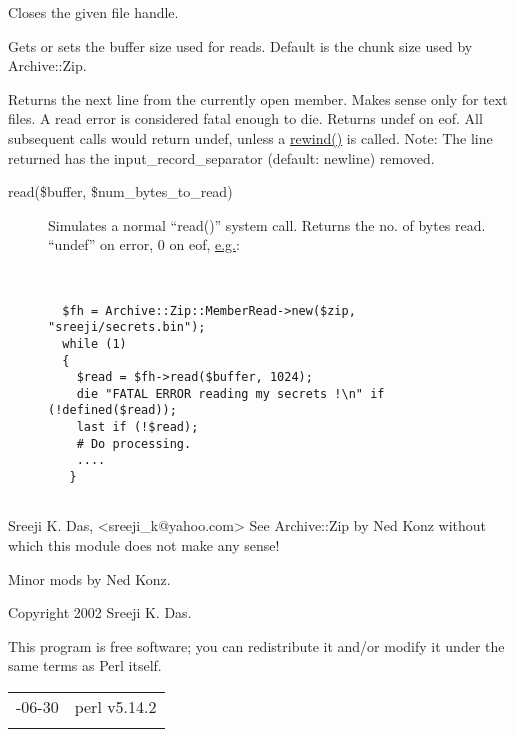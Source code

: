 \documentclass[]{article}
\renewcommand{\emph}[1]{\underline{#1}}
\begin{document}
\begin{description}
\itemsep1pt\parskip0pt
\item[\emph{close()}]
Closes the given file handle.
\end{description}

\begin{description}
\itemsep1pt\parskip0pt
\item[buffer\_size({[} \$size {]})]
Gets or sets the buffer size used for reads. Default is the chunk size
used by Archive::Zip.
\end{description}

\begin{description}
\itemsep1pt\parskip0pt
\item[\emph{getline()}]
Returns the next line from the currently open member. Makes sense only
for text files. A read error is considered fatal enough to die. Returns
undef on eof. All subsequent calls would return undef, unless a
\emph{rewind()} is called. Note: The line returned has the
input\_record\_separator (default: newline) removed.
\end{description}

\begin{description}
\item[read(\$buffer, \$num\_bytes\_to\_read)]
Simulates a normal ``read()'' system call. Returns the no. of bytes
read. ``undef'' on error, 0 on eof, \emph{e.g.}:

~

\begin{verbatim}
  $fh = Archive::Zip::MemberRead->new($zip, "sreeji/secrets.bin");
  while (1)
  {
    $read = $fh->read($buffer, 1024);
    die "FATAL ERROR reading my secrets !\n" if (!defined($read));
    last if (!$read);
    # Do processing.
    ....
   }
    
\end{verbatim}
\end{description}


Sreeji K. Das, \textless{}sreeji\_k@yahoo.com\textgreater{} See
Archive::Zip by Ned Konz without which this module does not make any
sense!

Minor mods by Ned Konz.


Copyright 2002 Sreeji K. Das.

This program is free software; you can redistribute it and/or modify it
under the same terms as Perl itself.

\begin{longtable}[c]{@{}ll@{}}
\toprule\addlinespace
2009-06-30 & perl v5.14.2
\\\addlinespace
\bottomrule
\end{longtable}
\end{document}
